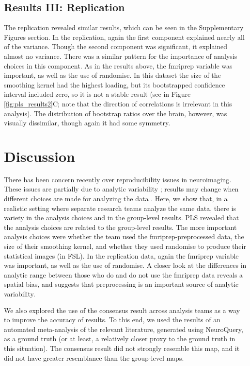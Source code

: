 \documentclass[a4paper,doc,natbib]{apa6}
\begin{document}
\subsection{Results III: Replication}
The replication revealed similar results, which can be seen in the Supplementary Figures section. In the replication, again the first component explained nearly all of the variance. Though the second component was significant, it explained almost no variance. There was a similar pattern for the importance of analysis choices in this component. As in the results above, the fmriprep variable was important, as well as the use of randomise. In this dataset the size of the smoothing kernel had the highest loading, but its bootstrapped confidence interval included zero, so it is not a stable result (see in Figure \ref{fig:pls_results2}C; note that the direction of correlations is irrelevant in this analysis). The distribution of bootstrap ratios over the brain, however, was visually dissimilar, though again it had some symmetry. 

\section{Discussion}
There has been concern recently over reproducibility issues in neuroimaging. These issues are partially due to analytic variability \citep{carp_plurality_2012}; results may change when different choices are made for analyzing the data \citep{carp_secret_2012}. Here, we show that, in a realistic setting where separate research teams analyze the same data, there is variety in the analysis choices and in the group-level results. PLS revealed that the analysis choices are related to the group-level results. The more important analysis choices were whether the team used the fmriprep-preprocessed data, the size of their smoothing kernel, and whether they used randomise to produce their statistical images (in FSL). In the replication data, again the fmriprep variable was important, as well as the use of randomise. A closer look at the differences in analytic range between those who do and do not use the fmriprep data reveals a spatial bias, and suggests that preprocessing is an important source of analytic variability.

We also explored the use of the consensus result across analysis teams as a way to improve the accuracy of results. To this end, we used the results of an automated meta-analysis of the relevant literature, generated using NeuroQuery, as a ground truth (or at least, a relatively closer proxy to the ground truth in this situation). The consensus result did not strongly resemble this map, and it did not have greater resemblance than the group-level maps. 
\end{document}
